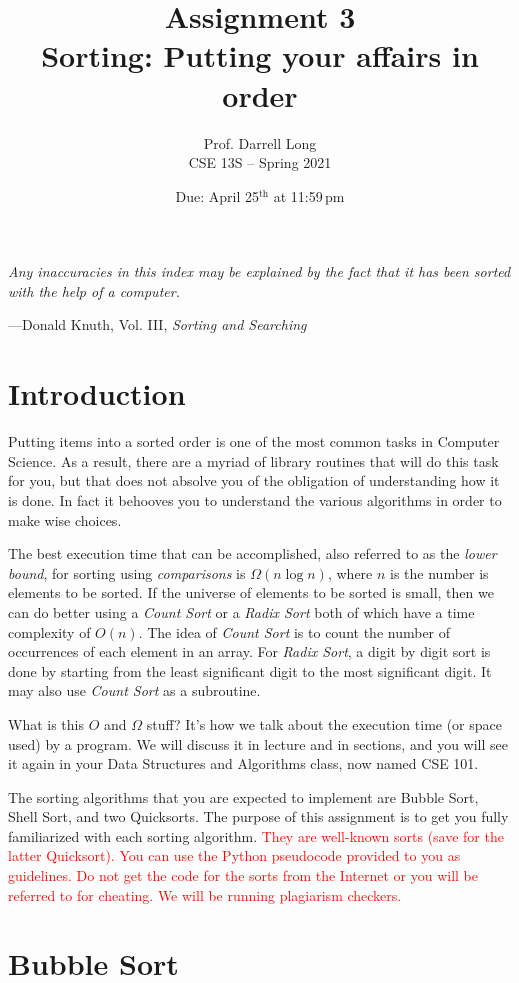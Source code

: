 \documentclass[11pt]{article}
\title{Assignment 3 \\ Sorting: Putting your affairs in order}
\author{Prof. Darrell Long \\ CSE 13S -- Spring 2021}
\date{Due: April 25$^\text{th}$ at 11:59\,pm}
\begin{document}
\maketitle

\textwidth
\epigraph{\emph{Any inaccuracies in this index may be explained by the
fact that it has been sorted with the help of a computer.}}{---Donald
Knuth, Vol.  III, \emph{Sorting and Searching}}


\section{Introduction}

Putting items into a sorted order is one of the most common tasks in
Computer Science. As a result, there are a myriad of library routines
that will do this task for you, but that does not absolve you of the
obligation of understanding how it is done. In fact it behooves you to
understand the various algorithms in order to make wise choices.

The best execution time that can be accomplished, also referred to as
the \emph{lower bound}, for sorting using \emph{comparisons} is
$\Omega(n \log n)$, where $n$ is the number is elements to be sorted. If
the universe of elements to be sorted is small, then we can do better
using a \emph{Count Sort} or a \emph{Radix Sort} both of which have a
time complexity of $O(n)$. The idea of \emph{Count Sort} is to count the
number of occurrences of each element in an array. For \emph{Radix
Sort}, a digit by digit sort is done by starting from the least
significant digit to the most significant digit. It may also use
\emph{Count Sort} as a subroutine.

What is this $O$ and $\Omega$ stuff? It's how we talk about the
execution time (or space used) by a program. We will discuss it in
lecture and in sections, and you will see it again in your Data
Structures and Algorithms class, now named CSE 101.

The sorting algorithms that you are expected to implement are Bubble
Sort, Shell Sort, and two Quicksorts. The purpose of this assignment is
to get you fully familiarized with each sorting algorithm.
\textcolor{red}{They are well-known sorts (save for the latter
  Quicksort). You can use the Python pseudocode provided to you as
  guidelines. Do not get the code for the sorts from the Internet or you
  will be referred to for cheating. We will be running plagiarism
checkers.}


\section{Bubble Sort}
\end{document}
